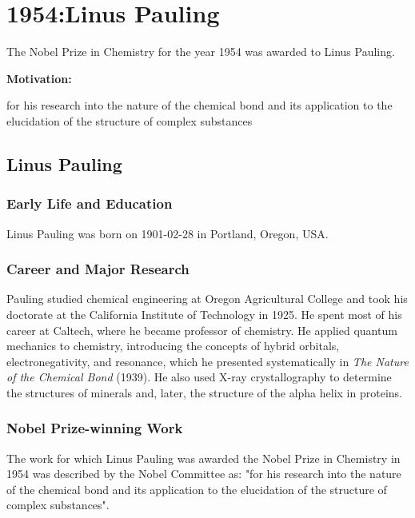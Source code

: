 \chapter{1954:Linus Pauling}

\label{chap:chemistry1954}

The Nobel Prize in Chemistry for the year 1954 was awarded to Linus Pauling.

\textbf{Motivation:}

for his research into the nature of the chemical bond and its application to the elucidation of the structure of complex substances

\section{Linus Pauling}

\subsection*{Early Life and Education}

Linus Pauling was born on 1901-02-28 in Portland, Oregon, USA.

\subsection*{Career and Major Research}

Pauling studied chemical engineering at Oregon Agricultural College and took his doctorate at the California Institute of Technology in 1925. He spent most of his career at Caltech, where he became professor of chemistry. He applied quantum mechanics to chemistry, introducing the concepts of hybrid orbitals, electronegativity, and resonance, which he presented systematically in \emph{The Nature of the Chemical Bond} (1939). He also used X-ray crystallography to determine the structures of minerals and, later, the structure of the alpha helix in proteins.

\subsection*{Nobel Prize-winning Work}

The work for which Linus Pauling was awarded the Nobel Prize in Chemistry in 1954 was described by the Nobel Committee as: "for his research into the nature of the chemical bond and its application to the elucidation of the structure of complex substances".


